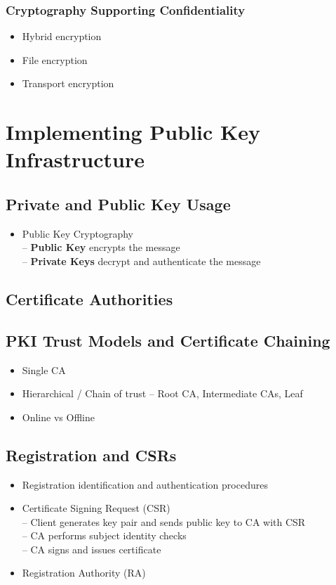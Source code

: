 		\subsubsection{Cryptography Supporting Confidentiality}
			\begin{itemize}
				\item Hybrid encryption
				\item File encryption
				\item Transport encryption
			\end{itemize}

\section {Implementing Public Key Infrastructure}
	\subsection {Private and Public Key Usage}
		\begin{itemize}
			\item Public Key Cryptography \\
				-- \textbf{Public Key} encrypts the message \\
				-- \textbf{Private Keys} decrypt and authenticate the message
		\end{itemize}
	\subsection {Certificate Authorities}
	\subsection {PKI Trust Models and Certificate Chaining}
		\begin{itemize}
			\item Single CA
			\item Hierarchical / Chain of trust -- Root CA, Intermediate CAs, Leaf
			\item Online vs Offline
		\end{itemize}
	\subsection {Registration and CSRs}
		\begin{itemize}
			\item Registration identification and authentication procedures
			\item Certificate Signing Request (CSR) \\
				-- Client generates key pair and sends public key to CA with CSR \\
				-- CA performs subject identity checks \\
				-- CA signs and issues certificate
			\item Registration Authority  (RA)
		\end{itemize}
